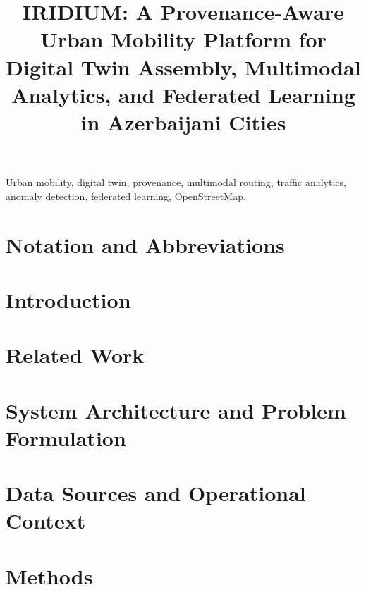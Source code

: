 \documentclass[journal]{IEEEtran}
\begin{document}
\title{IRIDIUM: A Provenance-Aware Urban Mobility Platform for
       Digital Twin Assembly, Multimodal Analytics, and Federated
       Learning in Azerbaijani Cities}



\maketitle

\begin{abstract}

\end{abstract}

\begin{IEEEkeywords}
Urban mobility, digital twin, provenance, multimodal routing,
traffic analytics, anomaly detection, federated learning, OpenStreetMap.
\end{IEEEkeywords}

\section*{Notation and Abbreviations}


\section{Introduction}
\label{sec:intro}


\section{Related Work}
\label{sec:related}


\section{System Architecture and Problem Formulation}
\label{sec:formulation}


\section{Data Sources and Operational Context}
\label{sec:data}


\section{Methods}
\label{sec:methods}

\end{document}
